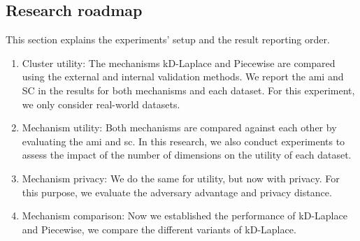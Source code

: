 \subsection{Research roadmap} \label{research-roadmap}
This section explains the experiments' setup and the result reporting order.
\begin{enumerate}
      \item Cluster utility: The mechanisms kD-Laplace and Piecewise are compared using the external and internal validation methods.
            We report the \gls{ami} and SC in the results for both mechanisms and each dataset.
            For this experiment, we only consider real-world datasets.
      \item Mechanism utility: Both mechanisms are compared against each other by evaluating the \gls{ami} and \gls{sc}.
            In this research, we also conduct experiments to assess the impact of the number of dimensions on the utility of each dataset.
      \item Mechanism privacy: We do the same for utility, but now with privacy.
            For this purpose, we evaluate the adversary advantage and privacy distance.
      \item Mechanism comparison: Now we established the performance of kD-Laplace and Piecewise, we compare the different variants of kD-Laplace.

\end{enumerate}
